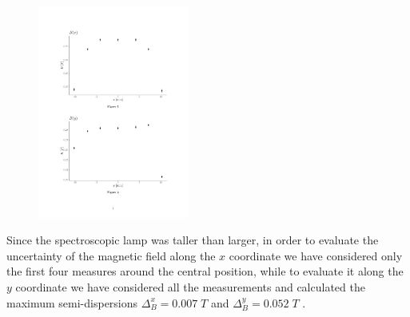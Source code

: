 \documentclass[a4paper,12pt,abstracton]{scrartcl}
\begin{document}
\begin{table}[H]
\centering
\caption{}
\label{table:disY}
\end{table}

\begin{figure}[H]
\begin{center}
\includegraphics[trim=3cm 4cm 3cm 15cm, clip,height=7cm,keepaspectratio]{plots/MagneticDishomogeneity.pdf}
\end{center}
\caption{}
\label{fig:disY}
\end{figure}

Since the spectroscopic lamp was taller than larger, in order to evaluate the uncertainty of the magnetic field along the $x$ coordinate we have considered only the first four measures around the central position, while to evaluate it along the $y$ coordinate we have considered all the measurements and calculated the maximum semi-dispersions $\Delta_B^x=0.007 \; T$ and $\Delta_B^y=0.052 \; T$ .
\end{document}
